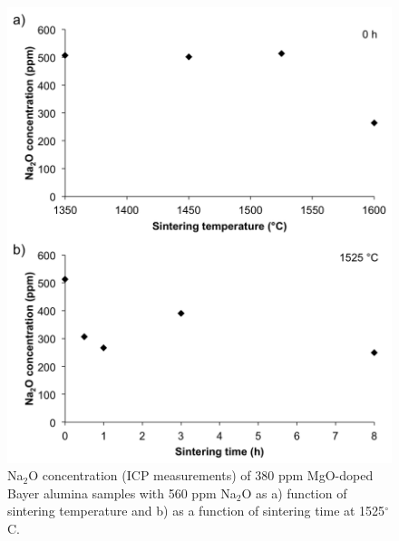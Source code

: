 \newpage
\begin{figure}[H]
	\centering
	\includegraphics[width=\textwidth]{Chapter-3/Figures/Figure12.png}
	\caption{Na$_{2}$O concentration (ICP measurements) of 380 ppm MgO-doped Bayer alumina samples with 560 ppm Na$_{2}$O as a) function of sintering temperature and b) as a function of sintering time at 1525$^{\circ}$C.}
	\label{Ch3-figure:Figure12}
\end{figure}
